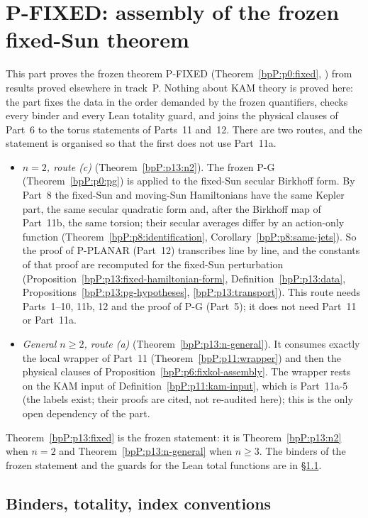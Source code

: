 \section{P-FIXED: assembly of the frozen fixed-Sun theorem}\label{bpP:p13}
\begingroup\sloppy

This part proves the frozen theorem P-FIXED (Theorem~\ref{bpP:p0:fixed}, ) from results proved elsewhere in track~P. Nothing about KAM theory is proved here: the part fixes the data in the order demanded by the frozen quantifiers, checks every binder and every Lean totality guard, and joins the physical clauses of Part~6 to the torus statements of Parts~11 and~12. There are two routes, and the statement is organised so that the first does not use Part~11a.
\begin{itemize}
\item \emph{$n=2$, route (c)} (Theorem~\ref{bpP:p13:n2}). The frozen P-G (Theorem~\ref{bpP:p0:pg}) is applied to the fixed-Sun secular Birkhoff form. By Part~8 the fixed-Sun and moving-Sun Hamiltonians have the same Kepler part, the same secular quadratic form and, after the Birkhoff map of Part~11b, the same torsion; their secular averages differ by an action-only function (Theorem~\ref{bpP:p8:identification}, Corollary~\ref{bpP:p8:same-jets}). So the proof of P-PLANAR (Part~12) transcribes line by line, and the constants of that proof are recomputed for the fixed-Sun perturbation (Proposition~\ref{bpP:p13:fixed-hamiltonian-form}, Definition~\ref{bpP:p13:data}, Propositions~\ref{bpP:p13:pg-hypotheses}, \ref{bpP:p13:transport}). This route needs Parts~1--10, 11b, 12 and the proof of P-G (Part~5); it does not need Part~11 or Part~11a.
\item \emph{General $n\ge2$, route (a)} (Theorem~\ref{bpP:p13:n-general}). It consumes exactly the local wrapper of Part~11 (Theorem~\ref{bpP:p11:wrapper}) and then the physical clauses of Proposition~\ref{bpP:p6:fixkol-assembly}. The wrapper rests on the KAM input of Definition~\ref{bpP:p11:kam-input}, which is Part~11a-5 (the labels exist; their proofs are cited, not re-audited here); this is the only open dependency of the part.
\end{itemize}
Theorem~\ref{bpP:p13:fixed} is the frozen statement: it is Theorem~\ref{bpP:p13:n2} when $n=2$ and Theorem~\ref{bpP:p13:n-general} when $n\ge3$. The binders of the frozen statement and the guards for the Lean total functions are in \S\ref{bpP:p13:sec-binders}.

\subsection{Binders, totality, index conventions}\label{bpP:p13:sec-binders}


